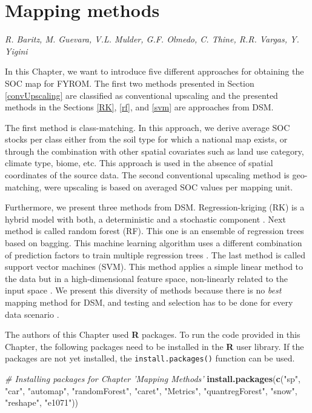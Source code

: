 \documentclass[10pt,b5paper,]{book}
\newenvironment{Shaded}{\begin{snugshade}}{\end{snugshade}}
\newcommand{\CommentTok}[1]{\textcolor[rgb]{0.56,0.35,0.01}{\textit{#1}}}
\newcommand{\KeywordTok}[1]{\textcolor[rgb]{0.13,0.29,0.53}{\textbf{#1}}}
\newcommand{\NormalTok}[1]{#1}
\newcommand{\StringTok}[1]{\textcolor[rgb]{0.31,0.60,0.02}{#1}}
\theoremstyle{definition}
\theoremstyle{definition}
\theoremstyle{definition}
\theoremstyle{remark}
\begin{document}
\hypertarget{mappingMethods}{%
\chapter{Mapping methods}\label{mappingMethods}}

\emph{R. Baritz, M. Guevara, V.L. Mulder, G.F. Olmedo, C. Thine, R.R.
Vargas, Y. Yigini}

In this Chapter, we want to introduce five different approaches for
obtaining the SOC map for FYROM. The first two methods presented in
Section \ref{convUpscaling} are classified as conventional upscaling and
the presented methods in the Sections \ref{RK}, \ref{rf}, and \ref{svm}
are approaches from DSM.

The first method is class-matching. In this approach, we derive average
SOC stocks per class either from the soil type for which a national map
exists, or through the combination with other spatial covariates such as
land use category, climate type, biome, etc. This approach is used in
the absence of spatial coordinates of the source data. The second
conventional upscaling method is geo-matching, were upscaling is based
on averaged SOC values per mapping unit.

Furthermore, we present three methods from DSM. Regression-kriging (RK)
is a hybrid model with both, a deterministic and a stochastic component
\citep{hengl2007regression}. Next method is called random forest (RF).
This one is an ensemble of regression trees based on bagging. This
machine learning algorithm uses a different combination of prediction
factors to train multiple regression trees \citep{Breiman1996}. The last
method is called support vector machines (SVM). This method applies a
simple linear method to the data but in a high-dimensional feature
space, non-linearly related to the input space \citep{Karatzoglou2006}.
We present this diversity of methods because there is no \emph{best}
mapping method for DSM, and testing and selection has to be done for
every data scenario \citep{guevara_2018}.

The authors of this Chapter used \textbf{R} packages. To run the code
provided in this Chapter, the following packages need to be installed in
the \textbf{R} user library. If the packages are not yet installed, the
\texttt{install.packages()} function can be used.

\begin{Shaded}
\begin{Highlighting}[]
\CommentTok{# Installing packages for Chapter 'Mapping Methods'}
\KeywordTok{install.packages}\NormalTok{(}\KeywordTok{c}\NormalTok{(}\StringTok{"sp"}\NormalTok{, }\StringTok{"car"}\NormalTok{, }\StringTok{"automap"}\NormalTok{,}
                   \StringTok{"randomForest"}\NormalTok{, }\StringTok{"caret"}\NormalTok{, }\StringTok{"Metrics"}\NormalTok{,}
                   \StringTok{"quantregForest"}\NormalTok{, }\StringTok{"snow"}\NormalTok{, }\StringTok{"reshape"}\NormalTok{,}
                   \StringTok{"e1071"}\NormalTok{))}
\end{Highlighting}
\end{Shaded}
\end{document}
